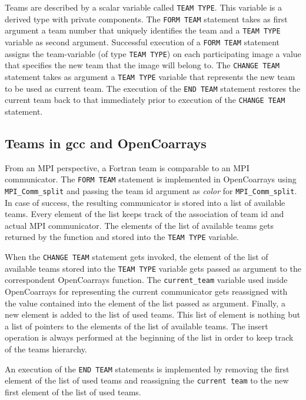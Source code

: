 Teams are described by a scalar variable called \texttt{TEAM TYPE}. This variable is a derived type with private components.
The \texttt{FORM TEAM} statement takes as first argument a team number that uniquely identifies the team and a \texttt{TEAM TYPE}
variable as second argument.
Successful execution of a \texttt{FORM TEAM} statement assigns the team-variable (of type \texttt{TEAM TYPE}) on each
participating image a value that specifies the new team that the image will belong to.
The \texttt{CHANGE TEAM} statement takes as argument a \texttt{TEAM TYPE} variable that represents the new team to be used as
current team. The execution of the \texttt{END TEAM} statement restores the current team back
to that immediately prior to execution of the \texttt{CHANGE TEAM} statement.

\subsection{Teams in \gls{gcc} and OpenCoarrays}\label{subsec:teams-in-gcc}

From an MPI perspective, a Fortran team is comparable to an MPI communicator. The \texttt{FORM TEAM} statement is implemented in OpenCoarrays
using \texttt{MPI\_Comm\_split} and passing the team id argument as \textit{color} for \texttt{MPI\_Comm\_split}.
In case of success, the resulting communicator is stored into a list of available teams.
Every element of the list keeps track of the association of team id and actual MPI communicator.
The elements of the list of available teams gets returned by the function and stored into the \texttt{TEAM TYPE} variable.

When the \texttt{CHANGE TEAM} statement gets invoked, the element of the list of available teams stored into the \texttt{TEAM TYPE} variable
gets passed as argument to the correspondent OpenCoarrays function. The \texttt{current\_team} variable used inside OpenCoarrays for
representing the current communicator gets reassigned with the value contained into the element of the list passed as argument.
Finally, a new element is added to the list of used teams. This list of element is nothing but a list of pointers to the elements of the list
of available teams. The insert operation is always performed at the beginning of the list in order to keep track of the teams hierarchy.

An execution of the \texttt{END TEAM} statements is implemented by removing the first element of the list of used teams and reassigning the
\texttt{current team} to the new first element of the list of used teams.

